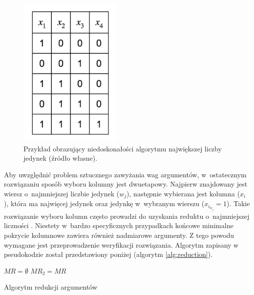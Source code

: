 \begin{figure}[H]
\centering
\includegraphics[width = 5cm]{chapter02/required-arguments.png}
\caption{Przykład obrazujący niedoskonałości algorytmu największej liczby jedynek (źródło własne).}
\label{fig:required-arguments}
\end{figure}

Aby uwzględnić problem sztucznego zawyżania wag argumentów,
w~ostatecznym rozwiązaniu sposób wyboru kolumny jest dwuetapowy.
Najpierw znajdowany jest wiersz o~najmniejszej liczbie jedynek ($w_j$),
następnie wybierana jest kolumna ($x_i$),
która ma najwięcej jedynek oraz jedynkę w~wybranym wierszu ($x_{i_{w_j}} = 1$).
Takie rozwiązanie wyboru kolumn często prowadzi do uzyskania reduktu o~najmniejszej liczności \cite{unate-artykul}.
Niestety w~bardzo specyficznych przypadkach końcowe minimalne pokrycie kolumnowe zawiera również nadmiarowe argumenty.
Z tego powodu wymagane jest przeprowadzenie weryfikacji rozwiązania.
Algorytm zapisany w pseudokodzie został przedstawiony poniżej (algorytm \ref{alg:reduction}).

\begin{algorithm}[h]
    $MR=\emptyset$\;
    $MR_2 = MR$\;
    \caption{Algorytm redukcji argumentów}
    \label{alg:reduction}
\end{algorithm}


